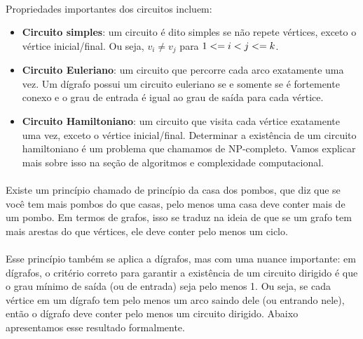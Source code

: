 \documentclass[12pt,a4paper]{article}
\def\leq{\string<=}%
\begin{document}
\paragraph{}
Propriedades importantes dos circuitos incluem:
\begin{itemize}
    \item \textbf{Circuito simples}: um circuito é dito simples se não repete vértices, exceto o vértice inicial/final. Ou seja, \(v_i \neq v_j\) para \(1 \leq i < j \leq k\).
    \item \textbf{Circuito Euleriano}: um circuito que percorre cada arco exatamente uma vez. Um dígrafo possui um circuito euleriano se e somente se é fortemente conexo e o grau de entrada é igual ao grau de saída para cada vértice.
    \item \textbf{Circuito Hamiltoniano}: um circuito que visita cada vértice exatamente uma vez, exceto o vértice inicial/final. Determinar a existência de um circuito hamiltoniano é um problema que chamamos de NP-completo. Vamos explicar mais sobre isso na seção de algoritmos e complexidade computacional.
\end{itemize}

\paragraph{}
Existe um princípio chamado de princípio da casa dos pombos, que diz que se você tem mais pombos do que casas, pelo menos uma casa deve conter mais de um pombo. Em termos de grafos, isso se traduz na ideia de que se um grafo tem mais arestas do que vértices, ele deve conter pelo menos um ciclo.

\paragraph{}
Esse princípio também se aplica a dígrafos, mas com uma nuance importante: em dígrafos, o critério correto para garantir a existência de um circuito dirigido é que o grau mínimo de saída (ou de entrada) seja pelo menos 1. Ou seja, se cada vértice em um dígrafo tem pelo menos um arco saindo dele (ou entrando nele), então o dígrafo deve conter pelo menos um circuito dirigido. Abaixo apresentamos esse resultado formalmente.
\end{document}
